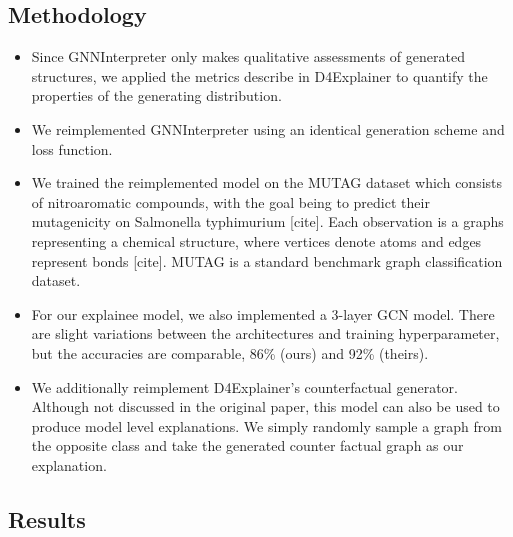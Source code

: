 \documentclass[
  11pt,
  letterpaper,
]{article}
\begin{document}
\hypertarget{methodology}{%
\subsection{Methodology}\label{methodology}}

\begin{itemize}
\item
  Since GNNInterpreter only makes qualitative assessments of generated
  structures, we applied the metrics describe in D4Explainer to quantify
  the properties of the generating distribution.
\item
  We reimplemented GNNInterpreter using an identical generation scheme
  and loss function.
\item
  We trained the reimplemented model on the MUTAG dataset which consists
  of nitroaromatic compounds, with the goal being to predict their
  mutagenicity on Salmonella typhimurium {[}cite{]}. Each observation is
  a graphs representing a chemical structure, where vertices denote
  atoms and edges represent bonds {[}cite{]}. MUTAG is a standard
  benchmark graph classification dataset.
\item
  For our explainee model, we also implemented a 3-layer GCN model.
  There are slight variations between the architectures and training
  hyperparameter, but the accuracies are comparable, 86\% (ours) and
  92\% (theirs).
\item
  We additionally reimplement D4Explainer's counterfactual generator.
  Although not discussed in the original paper, this model can also be
  used to produce model level explanations. We simply randomly sample a
  graph from the opposite class and take the generated counter factual
  graph as our explanation.
\end{itemize}

\hypertarget{results}{%
\subsection{Results}\label{results}}
\end{document}
